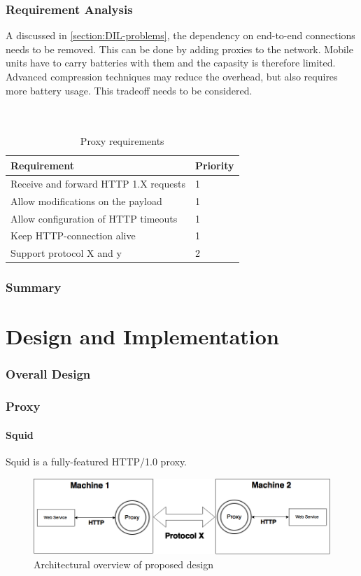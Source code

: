 \documentclass[USenglish]{article}
\begin{document}
\section{Requirement Analysis}
A discussed in \cref{section:DIL-problems}, the dependency on end-to-end connections needs to be removed. This can be done by adding proxies to the network.
Mobile units have to carry batteries with them and the capasity is therefore limited. Advanced compression techniques may reduce the overhead, but also requires more battery usage. This tradeoff needs to be considered.
\\ \\ \\
\begin{table}[h]
\begin{tabular}{| l | l |}
\hline
  \textbf{Requirement} & \textbf{Priority} \\ \hline
  Receive and forward HTTP 1.X requests & 1\\ \hline
  Allow modifications on the payload & 1 \\ \hline
  Allow configuration of HTTP timeouts & 1 \\ \hline
  Keep HTTP-connection alive & 1 \\ \hline
  Support protocol X and y & 2 \\ \hline
\end{tabular}
\caption{Proxy requirements}
\end{table}

\section{Summary}



\part{Design and Implementation}
\section{Overall Design}
\section{Proxy}
\subsection{Squid}
Squid is a fully-featured HTTP/1.0 proxy.
\begin{figure}[h]
\includegraphics[scale=0.4]{images/architecture.png}
\caption{Architectural overview of proposed design}
\end{figure}
\end{document}
